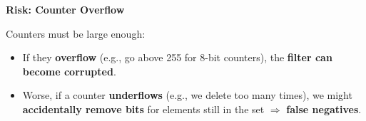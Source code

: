 \highspace
\begin{flushleft}
    \textcolor{Red2}{ \textbf{Risk: Counter Overflow}}
\end{flushleft}
Counters must be large enough:
\begin{itemize}
    \item If they \textbf{overflow} (e.g., go above 255 for 8-bit counters), the \textbf{filter can become corrupted}.
    \item Worse, if a counter \textbf{underflows} (e.g., we delete too many times), we might \textbf{accidentally remove bits} for elements still in the set $\Rightarrow$ \textbf{false negatives}.
\end{itemize}